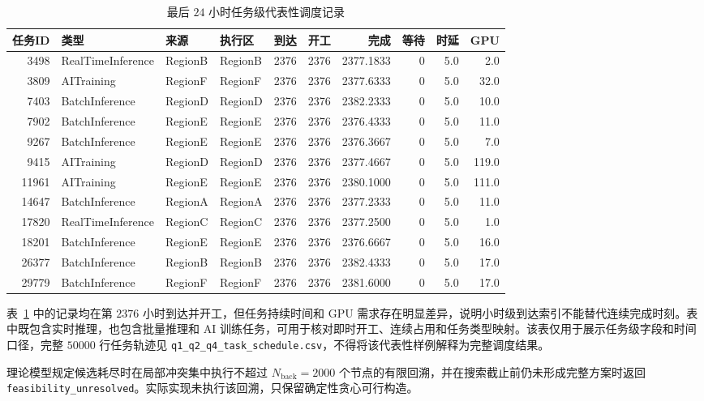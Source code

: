 \documentclass[withoutpreface,bwprint]{cumcmthesis}
\begin{document}
\begin{table}[htbp]
\centering
\caption{最后 $24$ 小时任务级代表性调度记录}
\label{tab:q1_schedule_examples}
\begin{tabular}{rllllrrrrr}
\toprule
任务ID & 类型 & 来源 & 执行区 & 到达 & 开工 & 完成 & 等待 & 时延 & GPU\\
\midrule
3498 & RealTimeInference & RegionB & RegionB & 2376 & 2376 & 2377.1833 & 0 & 5.0 & 2.0\\
3809 & AITraining & RegionF & RegionF & 2376 & 2376 & 2377.6333 & 0 & 5.0 & 32.0\\
7403 & BatchInference & RegionD & RegionD & 2376 & 2376 & 2382.2333 & 0 & 5.0 & 10.0\\
7902 & BatchInference & RegionE & RegionE & 2376 & 2376 & 2376.4333 & 0 & 5.0 & 11.0\\
9267 & BatchInference & RegionE & RegionE & 2376 & 2376 & 2376.3667 & 0 & 5.0 & 7.0\\
9415 & AITraining & RegionD & RegionD & 2376 & 2376 & 2377.4667 & 0 & 5.0 & 119.0\\
11961 & AITraining & RegionE & RegionE & 2376 & 2376 & 2380.1000 & 0 & 5.0 & 111.0\\
14647 & BatchInference & RegionA & RegionA & 2376 & 2376 & 2377.2333 & 0 & 5.0 & 11.0\\
17820 & RealTimeInference & RegionC & RegionC & 2376 & 2376 & 2377.2500 & 0 & 5.0 & 1.0\\
18201 & BatchInference & RegionE & RegionE & 2376 & 2376 & 2376.6667 & 0 & 5.0 & 16.0\\
26377 & BatchInference & RegionB & RegionB & 2376 & 2376 & 2382.4333 & 0 & 5.0 & 17.0\\
29779 & BatchInference & RegionF & RegionF & 2376 & 2376 & 2381.6000 & 0 & 5.0 & 17.0\\
\bottomrule
\end{tabular}
\end{table}

表~\ref{tab:q1_schedule_examples} 中的记录均在第 $2376$ 小时到达并开工，但任务持续时间和 GPU 需求存在明显差异，说明小时级到达索引不能替代连续完成时刻。表中既包含实时推理，也包含批量推理和 AI 训练任务，可用于核对即时开工、连续占用和任务类型映射。该表仅用于展示任务级字段和时间口径，完整 $50000$ 行任务轨迹见 \texttt{q1\_q2\_q4\_task\_schedule.csv}，不得将该代表性样例解释为完整调度结果。

理论模型规定候选耗尽时在局部冲突集中执行不超过 $N_{\mathrm{back}}=2000$ 个节点的有限回溯，并在搜索截止前仍未形成完整方案时返回 \texttt{feasibility\_unresolved}。实际实现未执行该回溯，只保留确定性贪心可行构造。
\end{document}
